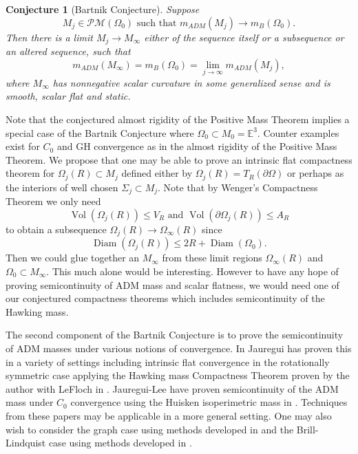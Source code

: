\documentclass[12pt]{amsart}
\newtheorem{conj}[thm]{Conjecture}
\begin{document}
\begin{conj}[Bartnik Conjecture]
Suppose
\begin{equation}\label{Bartnik-sequence}
M_j \in\mathcal{PM}(\Omega_0) \textrm{ such that }m_{ADM}(M_j) \to m_B(\Omega_0).
\end{equation}
Then there is a limit $M_j \to M_\infty$ either of the sequence itself or
a subsequence or an altered sequence, such that
\begin{equation}
m_{ADM}(M_\infty)=m_B(\Omega_0)=\lim_{j\to \infty} m_{ADM}(M_j),
\end{equation}
where $M_\infty$ has nonnegative scalar curvature in some generalized
sense and is smooth, scalar flat and static.
\end{conj}

Note that the conjectured almost rigidity of the Positive Mass Theorem implies 
a special case of the Bartnik Conjecture where 
$\Omega_0\subset M_0={\mathbb{E}}^3$.   
Counter examples exist for $C_0$ and GH convergence
as in the almost rigidity of the Positive Mass Theorem. 
We propose that one 
may be able to prove an intrinsic
flat compactness theorem for $\Omega_j(R) \subset M_j$ defined
either by $\Omega_j(R)=T_R(\partial \Omega)$ or perhaps as the
interiors of well chosen $\Sigma_j\subset M_j$.   Note that by Wenger's
Compactness Theorem we only need 
\begin{equation}
{\operatorname{Vol}}(\Omega_j(R))\le V_R \textrm{ and }
{\operatorname{Vol}}(\partial \Omega_j(R))\le A_R
\end{equation}
to obtain a subsequence $\Omega_j(R) \to \Omega_\infty(R)$
since
\begin{equation}
{\operatorname{Diam}}(\Omega_j(R))\le 2R + {\operatorname{Diam}}(\Omega_0).
\end{equation}
Then we could glue together an $M_\infty$ from these limit regions
$\Omega_\infty(R)$ and $\Omega_0\subset M_\infty$.   This much alone 
would be interesting.
However to have any hope of proving semicontinuity of ADM mass and 
scalar flatness, 
we would need one of our conjectured compactness theorems which
includes semicontinuity of the Hawking mass. 

The second component of the Bartnik Conjecture is to prove
the semicontinuity of ADM masses under various notions of convergence.
In \cite{Jauregui} 
Jauregui has proven this in a variety of settings including intrinsic flat
convergence in the rotationally symmetric case applying the Hawking mass
Compactness Theorem proven by the author with LeFloch in \cite{LeFloch-Sormani-1}.   
Jauregui-Lee have proven semicontinuity of the ADM mass
under $C_0$ convergence using the Huisken isoperimetric mass
in \cite{Jauregui-Lee:Huisken-isoper}.   Techniques from these papers may be applicable
in a more general setting.  One may also wish to consider the graph
case using methods developed in \cite{HLS} and the 
Brill-Lindquist case using methods developed in \cite{Sormani-Stavrov-1}.
\end{document}
